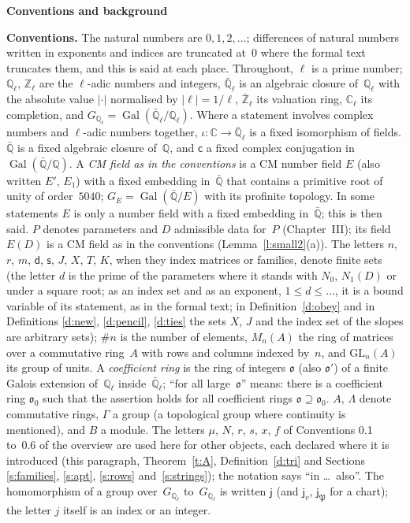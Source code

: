 \documentclass[11pt,a4paper]{article}
\newcommand{\Gal}{\operatorname{Gal}}
\newcommand{\m}[1]{\mbox{$#1$}}        %
\newcommand{\sect}[2]{\refstepcounter{section}\label{#2}\par\addvspace{19pt plus 4pt minus 2pt}\Needspace{7\baselineskip}%
  \noindent\llap{{\fontsize{13.2}{16}\selectfont\bfseries\color{inkfaint}\thesection}\hspace{9pt}}%
  {\fontsize{13.2}{16}\selectfont\bfseries\color{ink}#1}\par\nopagebreak\vspace{-1pt}}
\theoremstyle{plainx}
\theoremstyle{uprightx}
\newenvironment{conventions}{\par\addvspace{5pt}\noindent\textbf{Conventions.}\enspace\ignorespaces}{\par\addvspace{3pt}}
\newcommand{\CC}{\mathbb{C}}
\newcommand{\Qb}{\bar{\mathbb{Q}}}
\newcommand{\Ql}{\mathbb{Q}_\ell}
\newcommand{\Zl}{\mathbb{Z}_\ell}
\newcommand{\Qlb}{\bar{\mathbb{Q}}_\ell}
\newcommand{\Zlb}{\bar{\mathbb{Z}}_\ell}
\newcommand{\Cl}{\mathbb{C}_\ell}
\newcommand{\Gl}{G_{\mathbb{Q}_\ell}}
\newcommand{\GE}[1]{G_{#1}}
\newcommand{\fo}{\mathfrak{o}}
\newcommand{\fP}{\mathfrak{P}}
\newcommand{\GL}{\mathrm{GL}}
\newcommand{\ED}[1]{E(#1)}
\newcommand{\ND}[1]{N_1(#1)}
\begin{document}
\sect{Conventions and background}{s:back}
\begin{conventions}\label{c:conventions}
The natural numbers are \m{0,1,2,\dots}; differences of natural numbers written in exponents and indices are
truncated at~$0$ where the formal text truncates them, and this is said at each place. Throughout, $\ell$ is a
prime number; \m{\Ql}, \m{\Zl} are the $\ell$-adic numbers and integers, \m{\Qlb} is an algebraic closure
of~\m{\Ql} with the absolute value \m{|\cdot|} normalised by \m{|\ell|=1/\ell}, \m{\Zlb} its valuation ring,
\m{\Cl} its completion, and \m{\Gl=\Gal(\Qlb/\Ql)}. Where a statement involves complex numbers and $\ell$-adic
numbers together, \m{\iota\colon\CC\to\Qlb} is a fixed isomorphism of fields. \m{\Qb} is a fixed algebraic closure
of~$\mathbb{Q}$, and $\mathsf{c}$ a fixed complex conjugation in \m{\Gal(\Qb/\mathbb{Q})}. A \emph{CM field as in the
conventions} is a CM number field $E$ (also written $E'$, $E_1$) with a fixed embedding in~\m{\Qb} that
contains a primitive root of unity of order~$5040$; \m{\GE{E}=\Gal(\Qb/E)} with its profinite topology. In
some statements $E$ is only a number field with a fixed embedding in~\m{\Qb}; this is then said. $P$ denotes parameters and $D$ admissible data for~$P$
(Chapter~III); its field \m{\ED{D}} is a CM field as in the conventions (Lemma~\ref{l:small2}(a)). The letters
$n$, $r$, $m$, $\mathsf{d}$, $\mathsf{s}$, $J$, $X$, $T$, $K$, when they index matrices or families, denote finite sets (the
letter $d$ is the prime of the parameters where it stands with $N_0$, \m{\ND{D}} or under a square root; as an
index set and as an exponent, \m{1\le d\le\dots}, it is a bound variable of its statement, as in the formal text; in
Definition~\ref{d:obey} and in Definitions \ref{d:new}, \ref{d:pencil}, \ref{d:ties} the sets $X$, $J$ and the index
set of the slopes are arbitrary sets); \m{\#n} is the number of elements, \m{M_n(A)} the ring of matrices over a
commutative ring~$A$ with rows and columns indexed by~$n$, and \m{\GL_n(A)} its group of units. A
\emph{coefficient ring} is the ring of integers $\fo$ (also $\fo'$) of a finite Galois extension of~\m{\Ql}
inside~\m{\Qlb}; ``for all large~$\fo$'' means: there is a coefficient ring $\fo_0$ such that the assertion holds
for all coefficient rings \m{\fo\supseteq\fo_0}. $A$, $\Lambda$ denote commutative rings, $\Gamma$ a group
(a topological group where continuity is mentioned), and $B$ a module. The letters $\mu$, $N$, $r$, $s$, $x$, $f$ of Conventions 0.1 to~0.6 of the overview are used here for other
objects, each declared where it is introduced (this paragraph, Theorem~\ref{t:A}, Definition~\ref{d:tri} and Sections
\ref{s:families}, \ref{s:apt}, \ref{s:rows} and~\ref{s:strings}); the notation says ``in \dots\ also''. The homomorphism of a group over~\m{\Gl} to~\m{\Gl} is written $\mathsf{j}$ (and \m{\mathsf{j}_v}, \m{\mathsf{j}_{\fP}} for a chart); the letter $j$ itself is an index or an integer.
\end{conventions}
\end{document}
